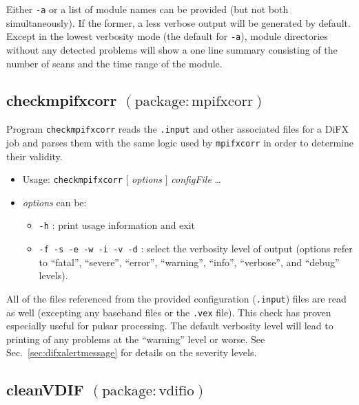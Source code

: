 Either {\tt -a} or a list of module names can be provided (but not both simultaneously).
If the former, a less verbose output will be generated by default.
Except in the lowest verbosity mode (the default for {\tt -a}), module directories without any detected problems will show a one line summary consisting of the number of scans and the time range of the module.








\subsection{checkmpifxcorr {\small $\mathrm{(package: mpifxcorr)}$}}

Program {\tt checkmpifxcorr} reads the {\tt .input} and other associated files for a DiFX job and parses them with the same logic used by {\tt mpifxcorr} in order to determine their validity.

\begin{itemize}
\item[] Usage: {\tt checkmpifxcorr}  $[$ {\em options} $]$ {\em configFile} \ldots
\item[] {\em options} can be:
\begin{itemize}
\item[] {\tt -h} : print usage information and exit
\item[] {\tt -f -s -e -w -i -v -d} : select the verbosity level of output (options refer to ``fatal'', ``severe'', ``error'', ``warning'', ``info'', ``verbose'', and ``debug'' levels).
\end{itemize}
\end{itemize}

All of the files referenced from the provided configuration ({\tt .input}) files are read as well (excepting any baseband files or the {\tt .vex} file).
This check has proven especially useful for pulsar processing.
The default verbosity level will lead to printing of any problems at the ``warning'' level or worse.
See Sec.~\ref{sec:difxalertmessage} for details on the severity levels.






\subsection{cleanVDIF {\small $\mathrm{(package: vdifio)}$} \label{sec:printVDIF}}

